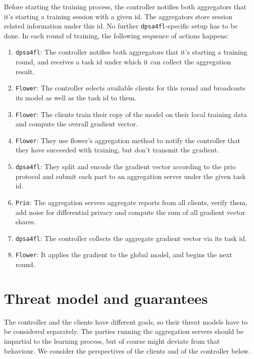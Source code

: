 \documentclass{article}
\begin{document}
Before starting the training process, the controller notifies both aggregators
that it's starting a training session with a given id. The aggregators store
session related information under this id. No further \texttt{dpsa4fl}-specific
setup has to be done.
In each round of training, the following sequence of actions happens:
\begin{enumerate}[itemsep=0mm]
\item \texttt{dpsa4fl}: The controller notifies both aggregators that it's
  starting a training round, and receives a task id under which it can collect
  the aggregation result.
\item \texttt{Flower}: The controller selects available clients for this round
  and broadcasts its model as well as the task id to them.
\item \texttt{Flower}: The clients train their copy of the model on their local training data and
  compute the overall gradient vector.
\item \texttt{Flower}: They use flower's aggregation method to notify the
  controller that they have succeeded with training, but don't transmit the gradient.
\item \texttt{dpsa4fl}: They split and encode the gradient vector according to the prio protocol
  and submit each part to an aggregation server under the given task id.
\item \texttt{Prio}: The aggregation servers aggregate reports from all clients, verify them,
  add noise for differential privacy and compute the sum of all gradient vector shares.
\item \texttt{dpsa4fl}: The controller collects the aggregate gradient vector via its task id.
\item \texttt{Flower}: It applies the gradient to the global model, and begins the next round.
\end{enumerate}


\section{Threat model and guarantees}
The controller and the clients have different goals, so their threat models
have to be considered separately. The parties running the aggregation
servers should be impartial to the learning process, but of course might deviate
from that behaviour. We consider the perspectives of the clients
and of the controller below.
\end{document}
